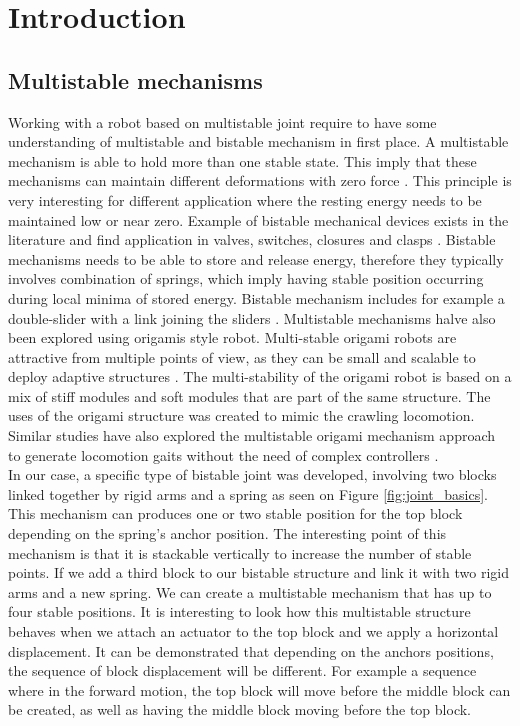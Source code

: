 \chapter{Introduction}
\setcounter{page}{1}

\section{Multistable mechanisms}
    Working with a robot based on multistable joint require to have some understanding of multistable and bistable mechanism in first place. A multistable mechanism is able to hold more than one stable state. This imply that these mechanisms can maintain different deformations with zero force \cite{programmable_multistable_mechanism}. This principle is very interesting for different application where the resting energy needs to be maintained low or near zero. Example of bistable mechanical devices exists in the literature and find application in valves, switches, closures and clasps \cite{howell}. Bistable mechanisms needs to be able to store and release energy, therefore they typically involves combination of springs, which imply having stable position occurring during local minima of stored energy. Bistable mechanism includes for example a double-slider with a link joining the sliders \cite{howell}.
    Multistable mechanisms halve also been explored using origamis style robot. Multi-stable origami robots are attractive from multiple points of view, as they can be small and scalable to deploy adaptive structures \cite{Pagano_2017}. The multi-stability of the origami robot is based on a mix of stiff modules and soft modules that are part of the same structure. The uses of the origami structure was created to mimic the crawling locomotion. Similar studies have also explored the multistable origami mechanism approach to generate locomotion gaits without the need of complex controllers \cite{peristaltic}.\\
    
    In our case, a specific type of bistable joint was developed, involving two blocks linked together by rigid arms and a spring as seen on Figure \ref{fig:joint_basics}. This mechanism can produces one or two stable position for the top block depending on the spring's anchor position. The interesting point of this mechanism is that it is stackable vertically to increase the number of stable points. If we add a third block to our bistable structure and link it with two rigid arms and a new spring. We can create a multistable mechanism that has up to four stable positions. It is interesting to look how this multistable structure behaves when we attach an actuator to the top block and we apply a horizontal displacement. It can be demonstrated that depending on the anchors positions, the sequence of block displacement will be different. For example a sequence where in the forward motion, the top block will move before the middle block can be created, as well as having the middle block moving before the top block. 
    
